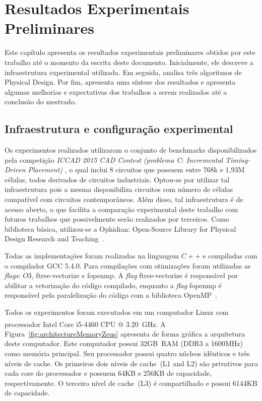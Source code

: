 \chapter{Resultados Experimentais Preliminares}
\label{cap:resultados}

Este capítulo apresenta os resultados experimentais preliminares obtidos por este trabalho até o momento da escrita deste documento. Inicialmente, ele descreve a infraestrutura experimental utilizada. Em seguida, analisa três algoritmos de Physical Design. Por fim, apresenta uma síntese dos resultados e apresenta algumas melhorias e expectativas dos trabalhos a serem realizados até  a conclusão do mestrado.



\section{Infraestrutura e configuração experimental}
\label{sec:infraestrutura_experimental}

Os experimentos realizados utilizaram o conjunto de benchmarks disponibilizados pela competição \textit{ICCAD 2015 CAD Contest (problema C: Incremental Timing-Driven Placement)} \cite{kim2015}, o qual inclui 8 circuitos que possuem entre 768k e 1,93M células, todos derivados de circuitos industriais. Optou-se por utilizar tal infraestrutura pois a mesma disponibiliza circuitos com número de células compatível com circuitos contemporâneos. Além disso, tal infraestrutura é de acesso aberto, o que facilita a comparação experimental deste trabalho com futuros trabalhos que possivelmente serão realizados por terceiros. Como biblioteca básica, utilizou-se a Ophidian: Open-Source Library for Physical Design Research and Teaching~\cite{ophidian}.

Todas as implementações foram realizadas na linguagem $C++$ e compiladas com o compilador GCC 5.4.0. Para compilações com otimizações foram utilizadas as \textit{flags}: $O3$, ftree-vectorize e fopenmp. A \textit{flag} ftree-vectorize é responsável por abilitar a vetorização do código compilado, enquanto a \textit{flag} fopenmp é responsável pela paralelização do código com a biblioteca OpenMP~\cite{openmp}.

Todos os experimentos foram executados em um computador Linux com processador Intel\textsuperscript{\textregistered} Core\textsuperscript{\textregistered} i5-4460 CPU @ 3.20~GHz.
A Figura~\ref{fig:architectureMemoryZeus} apresenta de forma gráfica a arquitetura deste computador.
Este computador possui 32GB~RAM (DDR3 a 1600MHz) como memória principal.
Seu processador possui quatro núcleos idênticos e três níveis de cache.
Os primeiros dois níveis de cache~(L1 and L2) são privativos para cada core do processador e possuem 64KB e 256KB de capacidade, respectivamente.
O terceiro nível de cache~(L3) é compartilhado e possui 6144KB de capacidade.


